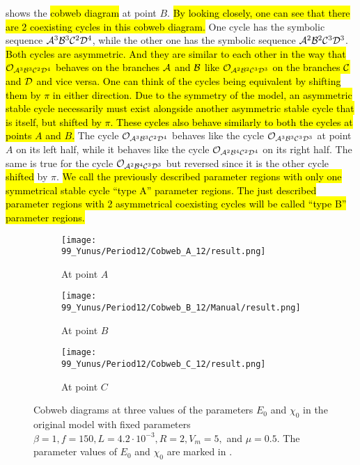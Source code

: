  shows the \hl{cobweb diagram} at point $B$.
\hl{By looking closely, one can see that there are 2 coexisting cycles in this cobweb diagram.}
One cycle has the symbolic sequence $\mathcal{A}^3\mathcal{B}^3\mathcal{C}^2\mathcal{D}^4$, while the other one has the symbolic sequence $\mathcal{A}^2\mathcal{B}^2\mathcal{C}^3\mathcal{D}^3$.
\hl{
	Both cycles are asymmetric.
	And they are similar to each other in the way that $\mathcal{O}_{\mathcal{A}^3\mathcal{B}^3\mathcal{C}^2\mathcal{D}^4}$ behaves on the branches $\mathcal{A}$ and $\mathcal{B}$ like $\mathcal{O}_{\mathcal{A}^2\mathcal{B}^2\mathcal{C}^3\mathcal{D}^3}$ on the branches $\mathcal{C}$ and $\mathcal{D}$ and vice versa.
	One can think of the cycles being equivalent by shifting them by $\pi$ in either direction.
	Due to the symmetry of the model, an asymmetric stable cycle necessarily must exist alongside another asymmetric stable cycle that is itself, but shifted by $\pi$.
	These cycles also behave similarly to both the cycles at points $A$ and $B$.
}
The cycle $\mathcal{O}_{\mathcal{A}^3\mathcal{B}^3\mathcal{C}^2\mathcal{D}^4}$ behaves like the cycle $\mathcal{O}_{\mathcal{A}^3\mathcal{B}^3\mathcal{C}^3\mathcal{D}^3}$ at point $A$ on its left half, while it behaves like the cycle $\mathcal{O}_{\mathcal{A}^2\mathcal{B}^4\mathcal{C}^2\mathcal{D}^4}$ on its right half.
The same is true for the cycle $\mathcal{O}_{\mathcal{A}^2\mathcal{B}^4\mathcal{C}^3\mathcal{D}^3}$ but reversed since it is the other cycle \hl{shifted} by $\pi$.
\hl{
	We call the previously described parameter regions with only one symmetrical stable cycle ``type A'' parameter regions.
	The just described parameter regions with 2 asymmetrical coexisting cycles will be called ``type B'' parameter regions.
}

\begin{figure}
	\centering
	\begin{subfigure}{0.3\textwidth}
		\centering
		\texttt{[image: 99\_Yunus/Period12/Cobweb\_A\_12/result.png]}
		\caption{At point $A$}
		\label{fig:setup.og.dynamics.cobweb.A}
	\end{subfigure}
	\begin{subfigure}{0.3\textwidth}
		\centering
		\texttt{[image: 99\_Yunus/Period12/Cobweb\_B\_12/Manual/result.png]}
		\caption{At point $B$}
		\label{fig:setup.og.dynamics.cobweb.B}
	\end{subfigure}
	\begin{subfigure}{0.3\textwidth}
		\centering
		\texttt{[image: 99\_Yunus/Period12/Cobweb\_C\_12/result.png]}
		\caption{At point $C$}
		\label{fig:setup.og.dynamics.cobweb.C}
	\end{subfigure}
	\caption[Cobweb diagrams of the original model]{
		Cobweb diagrams at three values of the parameters $E_0$ and $\chi_0$ in the original model with fixed parameters $\beta = 1, f = 150, L = 4.2 \cdot 10^{-3}, R = 2, V_m = 5,$ and $\mu = 0.5$.
		The parameter values of $E_0$ and $\chi_0$ are marked in .
	}
	\label{fig:setup.og.dynamics.cobwebs}
\end{figure}

